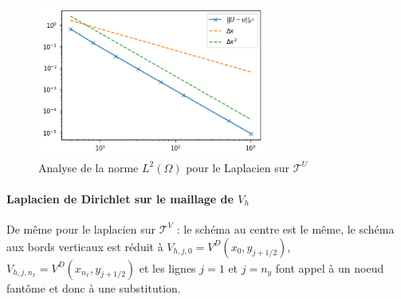 \begin{figure}[htp]
    \centering
    \includegraphics[width=7.5cm]{Images/stokes/Laplace Dirichlet 2D (U)/analyse.png}
    \caption{Analyse de la norme $L^2(\Omega)$ pour le Laplacien sur $\mathcal{T}^U$}
\end{figure}

\paragraph{Laplacien de Dirichlet sur le maillage de $V_h$} De même pour le laplacien sur $\mathcal{T}^V$ : le schéma au centre est le même, le schéma aux bords verticaux est réduit à $V_{h,j,0} = V^D(x_0, y_{j+1/2})$, $V_{h,j,n_x} = V^D(x_{n_x}, y_{j+1/2})$ et les lignes $j=1$ et $j=n_y$ font appel à un noeud fantôme et donc à une substitution.

